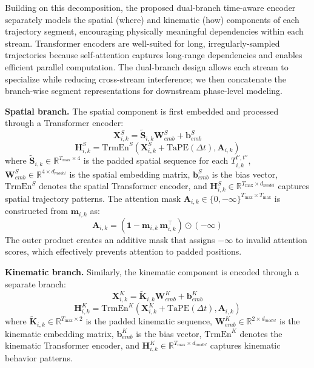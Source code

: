 \documentclass[iicol,pdflatex,sn-basic,Numbered]{sn-jnl}%
\theoremstyle{thmstyleone}%
\theoremstyle{thmstyletwo}%
\theoremstyle{thmstylethree}%
\begin{document}
Building on this decomposition, the proposed dual-branch time-aware encoder separately models the spatial (where) and kinematic (how) components of each trajectory segment, encouraging physically meaningful dependencies within each stream. Transformer encoders are well-suited for long, irregularly-sampled trajectories because self-attention captures long-range dependencies and enables efficient parallel computation. The dual-branch design allows each stream to specialize while reducing cross-stream interference; we then concatenate the branch-wise segment representations for downstream phase-level modeling.

\textbf{Spatial branch.} The spatial component is first embedded and processed through a Transformer encoder:
\begin{equation}
\mathbf{X}_{i,k}^S = \tilde{\mathbf{S}}_{i,k} \mathbf{W}_{emb}^S + \mathbf{b}_{emb}^S
\end{equation}
\begin{equation}
\mathbf{H}_{i,k}^S = \text{TrmEn}^S(\mathbf{X}_{i,k}^S + \mathrm{TaPE}(\Delta t), \mathbf{A}_{i,k})
\end{equation}
where $\tilde{\mathbf{S}}_{i,k} \in \mathbb{R}^{T_{\max} \times 4}$ is the padded spatial sequence for each $T^{t',t''}_{i,k}$, $\mathbf{W}_{emb}^S \in \mathbb{R}^{4 \times d_{model}}$ is the spatial embedding matrix, $\mathbf{b}_{emb}^S$ is the bias vector, $\text{TrmEn}^S$ denotes the spatial Transformer encoder, and $\mathbf{H}_{i,k}^S \in \mathbb{R}^{T_{\max} \times d_{model}}$ captures spatial trajectory patterns. The attention mask $\mathbf{A}_{i,k} \in \{0, -\infty\}^{T_{\max} \times T_{\max}}$ is constructed from $\mathbf{m}_{i,k}$ as:
\begin{equation}
\mathbf{A}_{i,k} = (\mathbf{1} - \mathbf{m}_{i,k}\,\mathbf{m}_{i,k}^{\top}) \odot (-\infty)
\end{equation}
The outer product creates an additive mask that assigns $-\infty$ to invalid attention scores, which effectively prevents attention to padded positions.

\textbf{Kinematic branch.} Similarly, the kinematic component is encoded through a separate branch:
\begin{equation}
\mathbf{X}_{i,k}^K = \tilde{\mathbf{K}}_{i,k} \mathbf{W}_{emb}^K + \mathbf{b}_{emb}^K
\end{equation}
\begin{equation}
\mathbf{H}_{i,k}^K = \text{TrmEn}^K(\mathbf{X}_{i,k}^K + \mathrm{TaPE}(\Delta t), \mathbf{A}_{i,k})
\end{equation}
where $\tilde{\mathbf{K}}_{i,k} \in \mathbb{R}^{T_{\max} \times 2}$ is the padded kinematic sequence, $\mathbf{W}_{emb}^K \in \mathbb{R}^{2 \times d_{model}}$ is the kinematic embedding matrix, $\mathbf{b}_{emb}^K$ is the bias vector, $\text{TrmEn}^K$ denotes the kinematic Transformer encoder, and $\mathbf{H}_{i,k}^K \in \mathbb{R}^{T_{\max} \times d_{model}}$ captures kinematic behavior patterns.
\end{document}
